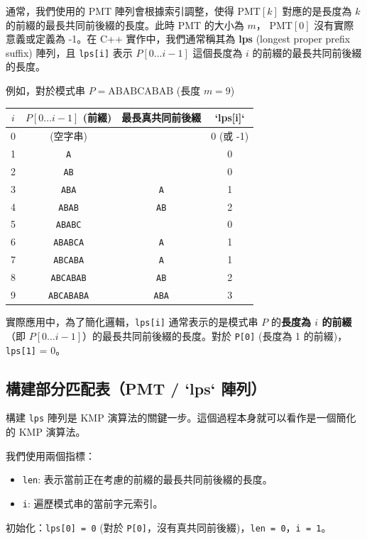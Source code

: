 通常，我們使用的 PMT 陣列會根據索引調整，使得 $\text{PMT}[k]$ 對應的是長度為 $k$ 的前綴的最長共同前後綴的長度。此時 PMT 的大小為 $m$， $\text{PMT}[0]$ 沒有實際意義或定義為 -1。在 C++ 實作中，我們通常稱其為 \textbf{lps} (longest proper prefix suffix) 陣列，且 \verb|lps[i]| 表示 $P[0 \dots i-1]$ 這個長度為 $i$ 的前綴的最長共同前後綴的長度。

例如，對於模式串 $P = \text{ABABCABAB}$ (長度 $m=9$)

\begin{tabular}{|c|c|c|c|}
    \hline
    $i$ & $P[0 \dots i-1]$ (前綴) & 最長真共同前後綴 & `lps[i]` \\
    \hline
    0 & (空字串) & & 0 (或 -1) \\
    1 & \verb|A| & & 0 \\
    2 & \verb|AB| & & 0 \\
    3 & \verb|ABA| & \verb|A| & 1 \\
    4 & \verb|ABAB| & \verb|AB| & 2 \\
    5 & \verb|ABABC| & & 0 \\
    6 & \verb|ABABCA| & \verb|A| & 1 \\
    7 & \verb|ABCABA| & \verb|A| & 1 \\
    8 & \verb|ABCABAB| & \verb|AB| & 2 \\
    9 & \verb|ABCABABA| & \verb|ABA| & 3 \\
    \hline
\end{tabular}

實際應用中，為了簡化邏輯，\verb|lps[i]| 通常表示的是模式串 $P$ 的\textbf{長度為 $i$ 的前綴}（即 $P[0 \dots i-1]$）的最長共同前後綴的長度。對於 \verb|P[0]| (長度為 1 的前綴)，\verb|lps[1]| = 0。

\subsection{構建部分匹配表（PMT / `lps` 陣列）}
構建 \verb|lps| 陣列是 KMP 演算法的關鍵一步。這個過程本身就可以看作是一個簡化的 KMP 演算法。

我們使用兩個指標：
\begin{itemize}
    \item \verb|len|: 表示當前正在考慮的前綴的最長共同前後綴的長度。
    \item \verb|i|: 遍歷模式串的當前字元索引。
\end{itemize}

初始化：\verb|lps[0] = 0| (對於 \verb|P[0]|，沒有真共同前後綴)，\verb|len = 0|，\verb|i = 1|。


